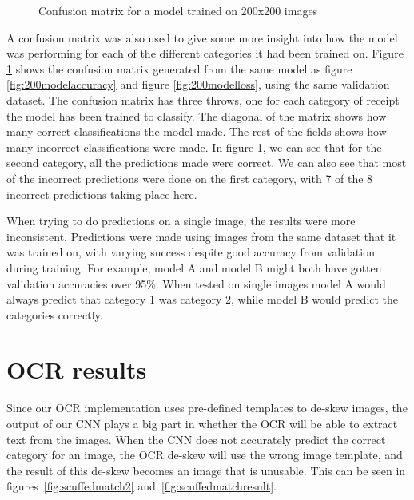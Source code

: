 \begin{figure}[h]
    \caption{Confusion matrix for a model trained on 200x200 images}
    \label{fig:200confusion}
\end{figure}

A confusion matrix was also used to give some more insight into how the model was performing for each of the different categories it had been trained on.
Figure \ref{fig:200confusion} shows the confusion matrix generated from the same model as figure \ref{fig:200modelaccuracy} and figure \ref{fig:200modelloss}, using the same validation dataset.
The confusion matrix has three throws, one for each category of receipt the model has been trained to classify.
The diagonal of the matrix shows how many correct classifications the model made.
The rest of the fields shows how many incorrect classifications were made.
In figure \ref{fig:200confusion}, we can see that for the second category, all the predictions made were correct.
We can also see that most of the incorrect predictions were done on the first category, with 7 of the 8 incorrect predictions taking place here.

When trying to do predictions on a single image, the results were more inconsistent.
Predictions were made using images from the same dataset that it was trained on, with varying success despite good accuracy from validation during training.
For example, model A and model B might both have gotten validation accuracies over 95\%.
When tested on single images model A would always predict that category 1 was category 2, while model B would predict the categories correctly.

\section{OCR results}\label{sec:ocr-results}
Since our OCR implementation uses pre-defined templates to de-skew images, the output of our CNN plays a big part in whether the OCR will be able to extract text from the images.
When the CNN does not accurately predict the correct category for an image, the OCR de-skew will use the wrong image template, and the result of this de-skew becomes an image that is unusable.
This can be seen in figures~\ref{fig:scuffedmatch2} and~\ref{fig:scuffedmatchresult}.

